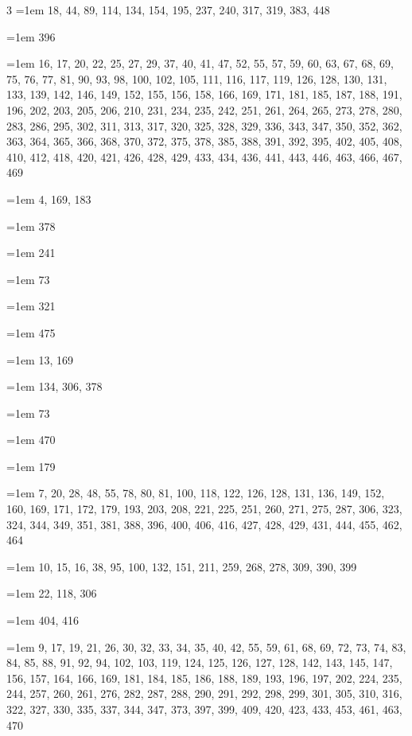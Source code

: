 \begin{multicols}{3}
\hangindent=1em  18, 44, 89, 114, 134, 154, 195, 237, 240, 317, 319, 383, 448\par
\hangindent=1em  396\par
\hangindent=1em  16, 17, 20, 22, 25, 27, 29, 37, 40, 41, 47, 52, 55, 57, 59, 60, 63, 67, 68, 69, 75, 76, 77, 81, 90, 93, 98, 100, 102, 105, 111, 116, 117, 119, 126, 128, 130, 131, 133, 139, 142, 146, 149, 152, 155, 156, 158, 166, 169, 171, 181, 185, 187, 188, 191, 196, 202, 203, 205, 206, 210, 231, 234, 235, 242, 251, 261, 264, 265, 273, 278, 280, 283, 286, 295, 302, 311, 313, 317, 320, 325, 328, 329, 336, 343, 347, 350, 352, 362, 363, 364, 365, 366, 368, 370, 372, 375, 378, 385, 388, 391, 392, 395, 402, 405, 408, 410, 412, 418, 420, 421, 426, 428, 429, 433, 434, 436, 441, 443, 446, 463, 466, 467, 469\par
\hangindent=1em  4, 169, 183\par
\hangindent=1em  378\par
\hangindent=1em  241\par
\hangindent=1em  73\par
\hangindent=1em  321\par
\hangindent=1em  475\par
\hangindent=1em  13, 169\par
\hangindent=1em  134, 306, 378\par
\hangindent=1em  73\par
\hangindent=1em  470\par
\hangindent=1em  179\par
\hangindent=1em  7, 20, 28, 48, 55, 78, 80, 81, 100, 118, 122, 126, 128, 131, 136, 149, 152, 160, 169, 171, 172, 179, 193, 203, 208, 221, 225, 251, 260, 271, 275, 287, 306, 323, 324, 344, 349, 351, 381, 388, 396, 400, 406, 416, 427, 428, 429, 431, 444, 455, 462, 464\par
\hangindent=1em  10, 15, 16, 38, 95, 100, 132, 151, 211, 259, 268, 278, 309, 390, 399\par
\hangindent=1em  22, 118, 306\par
\hangindent=1em  404, 416\par
\hangindent=1em  9, 17, 19, 21, 26, 30, 32, 33, 34, 35, 40, 42, 55, 59, 61, 68, 69, 72, 73, 74, 83, 84, 85, 88, 91, 92, 94, 102, 103, 119, 124, 125, 126, 127, 128, 142, 143, 145, 147, 156, 157, 164, 166, 169, 181, 184, 185, 186, 188, 189, 193, 196, 197, 202, 224, 235, 244, 257, 260, 261, 276, 282, 287, 288, 290, 291, 292, 298, 299, 301, 305, 310, 316, 322, 327, 330, 335, 337, 344, 347, 373, 397, 399, 409, 420, 423, 433, 453, 461, 463, 470\par

\end{multicols}
